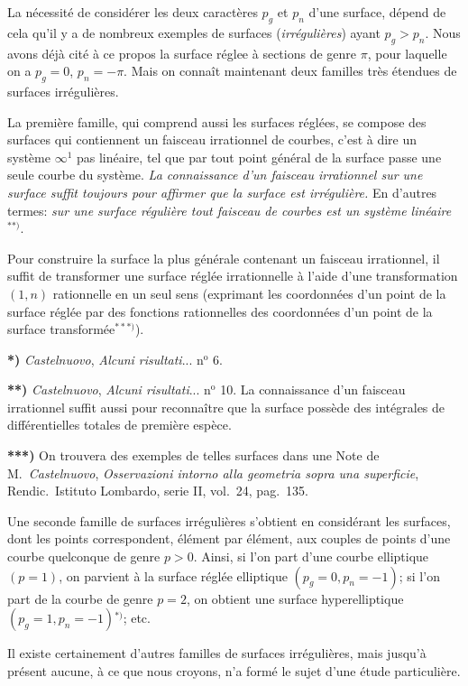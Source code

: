 \documentclass{article}
\begin{document}
La nécessité de considérer les deux caractères $p_{g}$ et $p_{n}$ d'une surface, dépend de cela qu'il y a de nombreux exemples de surfaces (\emph{irrégulières}) ayant $p_{g} > p_{n}$. Nous avons déjà cité à ce propos la surface réglee à sections de genre $\pi$, pour laquelle on a $p_{g} = 0$, $p_{n} = -\pi$. Mais on connaît maintenant deux familles très étendues de surfaces irrégulières.

La première famille, qui comprend aussi les surfaces réglées, se compose des surfaces qui contiennent un faisceau irrationnel de courbes, c'est à dire un système $\infty^{1}$ pas linéaire, tel que par tout point général de la surface passe une seule courbe du système. \emph{La connaissance d'un faisceau irrationnel sur une surface suffit toujours pour affirmer que la surface est irrégulière.} En d'autres termes: \emph{sur une surface régulière tout faisceau de courbes est un système linéaire}${}^{**)}$.

Pour construire la surface la plus générale contenant un faisceau irrationnel, il suffit de transformer une surface réglée irrationnelle à l'aide d'une transformation $(1, n)$ rationnelle en un seul sens (exprimant les coordonnées d'un point de la surface réglée par des fonctions rationnelles des coordonnées d'un point de la surface transformée${}^{***)}$).

\textbf{*)} \emph{Castelnuovo}, \emph{Alcuni risultati}... n${}^{\text{o}}$ 6.

\textbf{**)} \emph{Castelnuovo}, \emph{Alcuni risultati}... n${}^{\text{o}}$ 10. La connaissance d'un faisceau irrationnel suffit aussi pour reconnaître que la surface possède des intégrales de différentielles totales de première espèce.

\textbf{***)} On trouvera des exemples de telles surfaces dans une Note de M.\ \emph{Castelnuovo}, \emph{Osservazioni intorno alla geometria sopra una superficie}, Rendic.\ Istituto Lombardo, serie II, vol.\ 24, pag.\ 135.


Une seconde famille de surfaces irrégulières s'obtient en considérant les surfaces, dont les points correspondent, élément par élément, aux couples de points d'une courbe quelconque de genre $p > 0$. Ainsi, si l'on part d'une courbe elliptique $(p = 1)$, on parvient à la surface réglée elliptique $(p_{g} = 0, p_{n} = -1)$; si l'on part de la courbe de genre $p = 2$, on obtient une surface hyperelliptique $(p_{g} = 1, p_{n} = -1)$${}^{*)}$; etc.

Il existe certainement d'autres familles de surfaces irrégulières, mais jusqu'à présent aucune, à ce que nous croyons, n'a formé le sujet d'une étude particulière.
\end{document}
